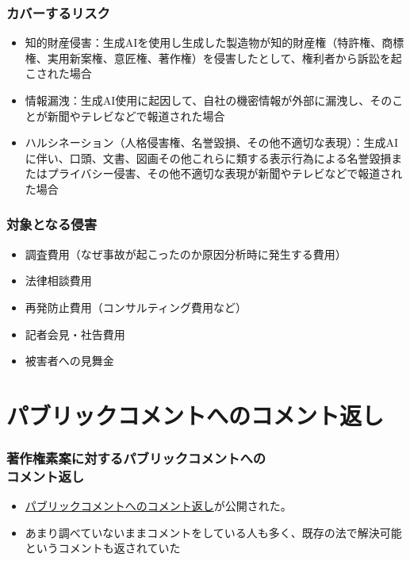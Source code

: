 \documentclass[dvipdfmx,12pt]{beamer}%
\begin{document}
\begin{frame}
\frametitle{カバーするリスク}
\begin{itemize}
\item 知的財産侵害：生成AIを使用し生成した製造物が知的財産権（特許権、商標権、実用新案権、意匠権、著作権）を侵害したとして、権利者から訴訟を起こされた場合
\item 情報漏洩：生成AI使用に起因して、自社の機密情報が外部に漏洩し、そのことが新聞やテレビなどで報道された場合
\item ハルシネーション（人格侵害権、名誉毀損、その他不適切な表現）：生成AIに伴い、口頭、文書、図画その他これらに類する表示行為による名誉毀損またはプライバシー侵害、その他不適切な表現が新聞やテレビなどで報道された場合
\end{itemize}
\end{frame}

\begin{frame}
\frametitle{対象となる侵害}
\begin{itemize}
\item 調査費用（なぜ事故が起こったのか原因分析時に発生する費用）
\item 法律相談費用
\item 再発防止費用（コンサルティング費用など）
\item 記者会見・社告費用
\item 被害者への見舞金
\end{itemize}
\end{frame}

\section{パブリックコメントへのコメント返し}

\begin{frame}
\frametitle{著作権素案に対するパブリックコメントへの\\コメント返し}
\begin{itemize}
\item \href{https://www.bunka.go.jp/seisaku/bunkashingikai/chosakuken/hoseido/r05_07/pdf/94011401_01.pdf}{パブリックコメントへのコメント返し}が公開された。
\item あまり調べていないままコメントをしている人も多く、既存の法で解決可能というコメントも返されていた
\end{itemize}
\end{frame}
\end{document}
